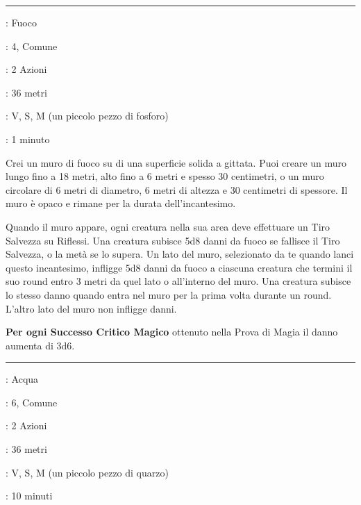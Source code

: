 \begin{multicols}{2}
\smallskip\noindent\rule{\linewidth}{2pt} \hypertarget{Muro di Fuoco}{}\medskip{}
\noindent
\begin{description}[noitemsep, topsep=0pt, parsep=0pt, partopsep=0pt, leftmargin=0cm, labelwidth=2.8cm]
	\item[\textbf{Lista di Magia}]: Fuoco
	\item[\textbf{Livello}]: 4, Comune
	\item[\textbf{T. di Lancio}]: 2 Azioni
	\item[\textbf{Gittata}]: 36 metri
	\item[\textbf{Componenti}]: V, S, M (un piccolo pezzo di fosforo)
	\item[\textbf{Durata}]: 1 minuto
\end{description}

Crei un muro di fuoco su di una superficie solida a gittata. Puoi creare un muro lungo fino a 18 metri, alto fino a 6 metri e spesso 30 centimetri, o un muro circolare di 6 metri di diametro, 6 metri di altezza e 30 centimetri di spessore. Il muro è opaco e rimane per la durata dell'incantesimo.

Quando il muro appare, ogni creatura nella sua area deve effettuare un Tiro Salvezza su Riflessi. Una creatura subisce 5d8 danni da fuoco se fallisce il Tiro Salvezza, o la metà se lo supera. Un lato del muro, selezionato da te quando lanci questo incantesimo, infligge 5d8 danni da fuoco a ciascuna creatura che termini il suo round entro 3 metri da quel lato o all'interno del muro. Una creatura subisce lo stesso danno quando entra nel muro per la prima volta durante un round. L'altro lato del muro non infligge danni.

\textbf{Per ogni Successo Critico Magico} ottenuto nella Prova di Magia il danno aumenta di 3d6.

\smallskip\noindent\rule{\linewidth}{2pt} \hypertarget{Muro di Ghiaccio}{}\medskip{}
\noindent
\begin{description}[noitemsep, topsep=0pt, parsep=0pt, partopsep=0pt, leftmargin=0cm, labelwidth=2.8cm]
	\item[\textbf{Lista di Magia}]: Acqua
	\item[\textbf{Livello}]: 6, Comune
	\item[\textbf{T. di Lancio}]: 2 Azioni
	\item[\textbf{Gittata}]: 36 metri
	\item[\textbf{Componenti}]: V, S, M (un piccolo pezzo di quarzo)
	\item[\textbf{Durata}]: 10 minuti
\end{description}


\end{multicols}

